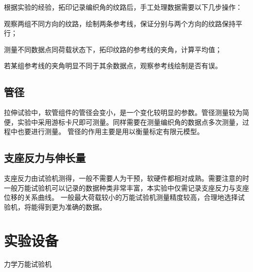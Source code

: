 根据实验的经验，拓印记录编织角的纹路后，手工处理数据需要以下几步操作：
\begin{compactenum}
\item 观察两组不同方向的纹路，绘制两条参考线，保证分别与两个方向的纹路保持平行；
\item 测量不同数据点同荷载状态下，拓印纹路的参考线的夹角，计算平均值；
\item 若某组参考线的夹角明显不同于其余数据点，观察参考线绘制是否有误。
\end{compactenum}





\subsection{管径}
拉伸试验中，软管组件的管径会变小，是一个变化较明显的参数。管径测量较为简便，实验中采用游标卡尺即可测量。同样需要在测量编织角的数据点多次测量，过程中也要进行测量。
管径的作用主要是用以衡量标定有限元模型。
\subsection{支座反力与伸长量}
支座反力由试验机测得，一般不需要人为干预，软硬件都相对成熟。需要注意的时一般万能试验机可以记录的数据种类非常丰富，本实验中仅需记录支座反力与支座位移的关系曲线。
一般最大荷载较小的万能试验机测量精度较高，合理地选择试验机，将能得到更为准确的数据。







\section{实验设备}

力学万能试验机


\begin{figure}[!htbp]
	\centering
	\hspace{1cm}
\end{figure}


